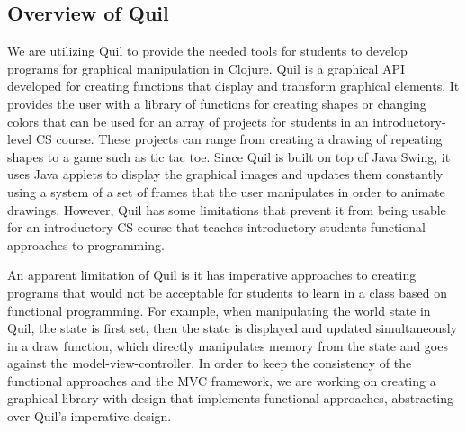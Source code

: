 \documentclass[12pt]{article}
\newcommand{\comment}[1]{}
\newcommand{\todo}[1]{\textcolor{blue}{\comment{To Do: {#1}}}}
\begin{document}
\subsection{Overview of Quil}\label{subsec:quil}
We are utilizing Quil to provide the needed tools for students to develop programs for graphical manipulation in Clojure. Quil is a graphical API developed for creating functions that display and transform graphical elements. It provides the user with a library of functions for creating shapes or changing colors that can be used for an array of projects for students in an introductory-level CS course. These projects can range from creating a drawing of repeating shapes to a game such as tic tac toe. Since Quil is built on top of Java Swing, it uses Java applets to display the graphical images and updates them constantly using a system of a set of frames that the user manipulates in order to animate drawings. However, Quil has some limitations that prevent it from being usable for an introductory CS course that teaches introductory students functional approaches to programming.

An apparent limitation of Quil is it has imperative approaches to creating programs that would not be acceptable for students to learn in a class based on functional programming. For example, when manipulating the world state in Quil, the state is first set, then the state is displayed and updated simultaneously in a draw function, which directly manipulates memory from the state and goes against the model-view-controller. In order to keep the consistency of the functional approaches and the MVC framework, we are working on creating a graphical library with design that implements functional approaches, abstracting over Quil's imperative design. 
\end{document}
